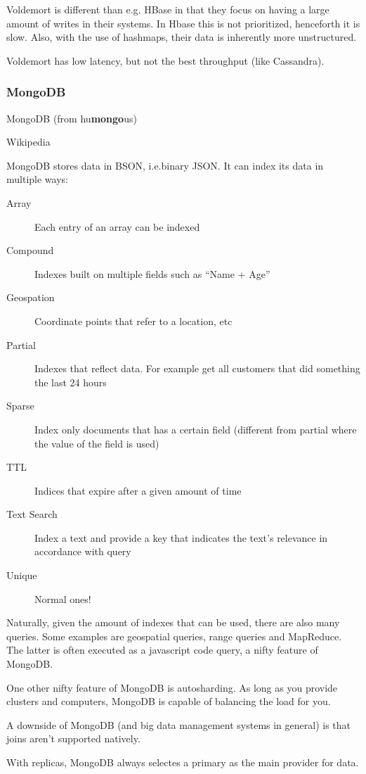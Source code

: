 Voldemort is different than e.g. HBase in that they focus on having a large
amount of writes in their systems.  In Hbase this is not prioritized,
henceforth it is slow. Also, with the use of hashmaps, their data is inherently
more unstructured.

Voldemort has low latency, but not the best throughput (like Cassandra).

\subsubsection*{MongoDB}
\epigraph{MongoDB (from hu\textbf{mongo}us)}{Wikipedia}

MongoDB stores data in BSON, i.e.\@ binary JSON. It can index its data in multiple ways:
\begin{description}
    \item[Array] Each entry of an array can be indexed
    \item[Compound] Indexes built on multiple fields such as ``Name  + Age''
    \item[Geospation] Coordinate points that refer to a location, etc
    \item[Partial] Indexes that reflect data. For example get all customers that did something the last 24 hours
    \item[Sparse] Index only documents that has a certain field (different from partial where the value of the field is used)
    \item[TTL] Indices that expire after a given amount of time
    \item[Text Search] Index a text and provide a key that indicates the text's relevance in accordance with query
    \item[Unique] Normal ones!
\end{description}

Naturally, given the amount of indexes that can be used, there are also many queries.
Some examples are geospatial queries, range queries and MapReduce. The latter is often
executed as a javascript code query, a nifty feature of MongoDB.

One other nifty feature of MongoDB is autosharding. As long as you provide clusters
and computers, MongoDB is capable of balancing the load for you.

A downside of MongoDB (and big data management systems in general) is that joins
aren't supported natively. 

With replicas, MongoDB always selectes a primary as the main provider for data.

